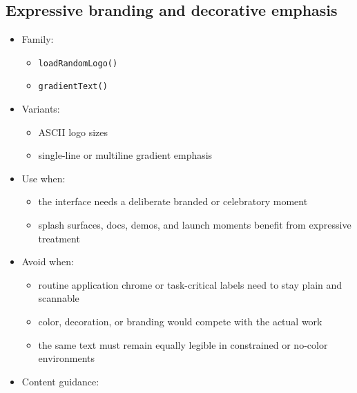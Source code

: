 \subsection{Expressive branding and decorative emphasis}\label{record-019-expressive-branding-and-decorative-emphasis}

\begin{itemize}
\tightlist
\item
  Family:

  \begin{itemize}
  \tightlist
  \item
    \texttt{l\allowbreak{}o\allowbreak{}a\allowbreak{}d\allowbreak{}R\allowbreak{}a\allowbreak{}n\allowbreak{}d\allowbreak{}o\allowbreak{}m\allowbreak{}L\allowbreak{}o\allowbreak{}g\allowbreak{}o\allowbreak{}(\allowbreak{})}
  \item
    \texttt{g\allowbreak{}r\allowbreak{}a\allowbreak{}d\allowbreak{}i\allowbreak{}e\allowbreak{}n\allowbreak{}t\allowbreak{}T\allowbreak{}e\allowbreak{}x\allowbreak{}t\allowbreak{}(\allowbreak{})}
  \end{itemize}
\item
  Variants:

  \begin{itemize}
  \tightlist
  \item
    ASCII logo sizes
  \item
    single-line or multiline gradient emphasis
  \end{itemize}
\item
  Use when:

  \begin{itemize}
  \tightlist
  \item
    the interface needs a deliberate branded or celebratory moment
  \item
    splash surfaces, docs, demos, and launch moments benefit from expressive treatment
  \end{itemize}
\item
  Avoid when:

  \begin{itemize}
  \tightlist
  \item
    routine application chrome or task-critical labels need to stay plain and scannable
  \item
    color, decoration, or branding would compete with the actual work
  \item
    the same text must remain equally legible in constrained or no-color environments
  \end{itemize}
\item
  Content guidance:


\end{itemize}
